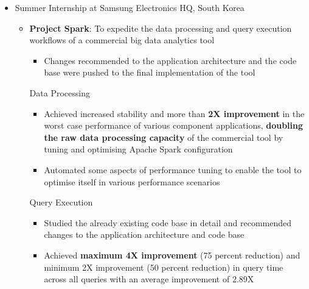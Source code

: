 \documentclass{article}
\begin{document}
\begin{itemize}[leftmargin=0.07cm]
\item {\large Summer Internship at Samsung Electronics HQ, South Korea}\hspace*{\fill}
\vspace{-0cm}
\begin{itemize}[leftmargin=0.07cm]
	\item \textbf{Project Spark}: To expedite the data processing and query execution workflows	of a commercial big data analytics tool
	\begin{itemize}
	\item Changes recommended to the application architecture and the code base were pushed to the final implementation of the tool
	\end{itemize}
	Data Processing\\ \vspace{-0.2cm}
	\begin{itemize}
	\item Achieved increased stability and more than \textbf{2X improvement} in the worst case performance of various component applications, \textbf{doubling the raw data processing capacity} of the commercial tool by tuning and optimising Apache Spark configuration
    \item Automated some aspects of performance tuning to enable the tool to optimise itself in various performance scenarios
    \end{itemize}
    \hspace{0.1cm}Query Execution\\   \vspace{-0.2cm}
	\begin{itemize}
	\item Studied the already existing code base in detail and recommended changes to the application architecture and code base
    \item Achieved \textbf{maximum 4X improvement} (75 percent reduction) and minimum 2X improvement (50 percent reduction) in query time across all queries with an average improvement of 2.89X
    \end{itemize}
\end{itemize}
\end{itemize}
\renewcommand{\labelitemi}{}
\renewcommand\labelitemii{$\circ$}
\renewcommand{\labelitemiii}{$\bullet$}
\end{document}
